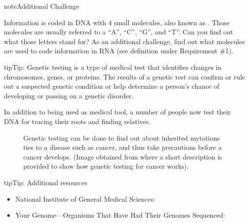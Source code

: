 \documentclass[letterpaper,10pt,english,openany,oneside]{sphinxmanual}
\let\sphinxpxdimen\pdfpxdimen\else\newdimen\sphinxpxdimen
\begin{document}
\begin{sphinxadmonition}{note}{Additional Challenge}

Information is coded in DNA with 4 small molecules, also known as . Those molecules are usually referred to a “A”, “C”, “G”, and “T”. Can you find out what those letters stand for? As an additional challenge, find out what molecules are used to code information in RNA (see definition under Requirement \#1).
\end{sphinxadmonition}

\begin{sphinxadmonition}{tip}{Tip:}
Genetic testing is a type of medical test that identifies changes in chromosomes, genes, or proteins. The results of a genetic test can confirm or rule out a suspected genetic condition or help determine a person’s chance of developing or passing on a genetic disorder.

In addition to being used as medical tool, a number of people now test their DNA for tracing their roots and finding relatives.

\begin{figure}[H]
\centering
\capstart

\noindent\sphinxincludegraphics[width=300\sphinxpxdimen]{{DNA-cancer-genetics}.jpg}
\caption{Genetic testing can be done to find out about inherited mytations ties to a disease such as cancer, and thus take precautions before a cancer develops.  (Image obtained from  where a short description is provided to show how genetic testing for cancer works).}\label{\detokenize{requirement6:id1}}\end{figure}
\end{sphinxadmonition}

\begin{sphinxadmonition}{tip}{Tip:}
Additional resources
\begin{itemize}
\item {} 
National Institute of General Medical Sciences: 

\item {} 
Your Genome—Organisms That Have Had Their Genomes Sequenced: 

\end{itemize}
\end{sphinxadmonition}
\end{document}
